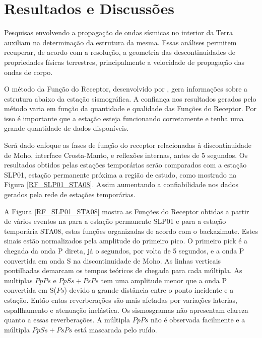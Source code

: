 \chapter{Resultados e Discussões}	

Pesquisas envolvendo a propagação de ondas sísmicas no interior da Terra auxiliam na determinação da estrutura da mesma. Essas análises permitem recuperar, de acordo com a resolução, a geometria das descontinuidades de propriedades físicas terrestres, principalmente a velocidade de propagação das ondas de corpo.  

O método da Função do Receptor, desenvolvido por \cite{Langston_1977}, gera informações sobre a estrutura abaixo da estação sismográfica. A confiança nos resultados gerados pelo método varia em função da quantidade e qualidade das Funções do Receptor. Por isso é importante que a estação esteja funcionando corretamente e tenha uma grande quantidade de dados disponíveis.

Será dado enfoque as fases de função do receptor relacionadas à discontinuidade de Moho, interface Crosta-Manto, e reflexões  internas, antes de 5 segundos. Os resultados obtidos pelas estações temporárias serão comparados com a estação SLP01, estação permanente próxima a região de estudo, como mostrado na Figura \ref{RF_SLP01_STA08}. Assim aumentando a confiabilidade nos dados gerados pela rede de estações temporárias.

A Figura \ref{RF_SLP01_STA08} mostra as Funções do Receptor obtidas a partir de vários eventos na para a estação permanente SLP01 e para a estação temporária STA08, estas funções organizadas de acordo com o backazimute. Estes sinais estão normalizados pela amplitude do primeiro pico. O primeiro pick é a chegada da onda P direta, já o segundos, por volta de 5 segundos, e a onda P convertida em onda S na discontinuidade de Moho. As linhas verticais pontilhadas demarcam os tempos teóricos de chegada para cada múltipla. As multiplas $PpPs$ e $PpSs+PsPs$ tem uma amplitude menor que a onda P convertida em S($Ps$) devido a grande distância entre o ponto incidente e a estação. Então entas reverberações são mais afetadas por variações laterias, espallhamento e atenuação inelástica. Os sismosgramas não apresentam clareza quanto a essas reverberações. A múltipla $PpPs$ não é observada facilmente e a múltipla $PpSs+PsPs$ está mascarada pelo ruído.

